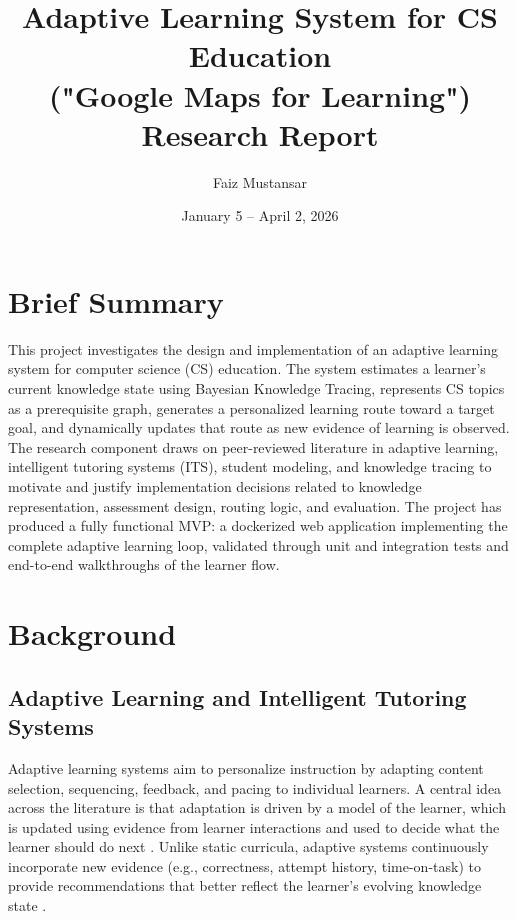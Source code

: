 \documentclass{article}
\title{Adaptive Learning System for CS Education\\("Google Maps for Learning")\\\large Research Report}
\author{Faiz Mustansar}
\date{January 5 -- April 2, 2026}
\begin{document}
\maketitle


\section*{Brief Summary}
This project investigates the design and implementation of an adaptive learning
system for computer science (CS) education. The system estimates a learner’s
current knowledge state using Bayesian Knowledge Tracing, represents CS topics
as a prerequisite graph, generates a personalized learning route toward a target
goal, and dynamically updates that route as new evidence of learning is observed.
The research component draws on peer-reviewed literature in adaptive learning,
intelligent tutoring systems (ITS), student modeling, and knowledge tracing to
motivate and justify implementation decisions related to knowledge representation,
assessment design, routing logic, and evaluation. The project has produced a
fully functional MVP: a dockerized web application implementing the complete
adaptive learning loop, validated through unit and integration tests and
end-to-end walkthroughs of the learner flow.

\tableofcontents
\newpage


\section{Background}

\subsection{Adaptive Learning and Intelligent Tutoring Systems}

Adaptive learning systems aim to personalize instruction by adapting content
selection, sequencing, feedback, and pacing to individual learners. A central
idea across the literature is that adaptation is driven by a model of the learner,
which is updated using evidence from learner interactions and used to decide what
the learner should do next \cite{brusilovsky2001,woolf2009}. Unlike static curricula,
adaptive systems continuously incorporate new evidence (e.g., correctness,
attempt history, time-on-task) to provide recommendations that better reflect the
learner’s evolving knowledge state \cite{brusilovsky2001}.
\end{document}
